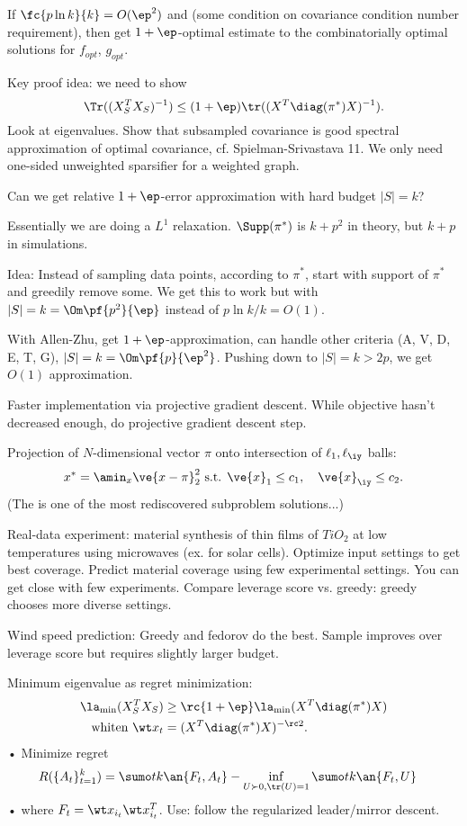 If $\fc{p\ln k}{k} = O(\ep^2)$ and (some condition on covariance condition number requirement), then get $1+\ep$-optimal estimate to the combinatorially optimal solutions for $f_{opt}$, $g_{opt}$. 

Key proof idea: we need to show
$$
\Tr((X_S^TX_S)^{-1}) \le (1+\ep) \tr((X^T\diag(\pi^*)X)^{-1}).
$$
Look at eigenvalues. Show that subsampled covariance is good spectral approximation of optimal covariance, cf. Spielman-Srivastava 11. 
We only need one-sided unweighted sparsifier for a weighted graph. %

Can we get relative $1+\ep$-error approximation with hard budget $|S|=k$?

Essentially we are doing a $L^1$ relaxation. 
$\Supp(\pi^*)$ is $k+p^2$ in theory, but $k+p$ in simulations.

Idea: Instead of sampling data points, according to $\pi^*$, start with support of $\pi^*$ and greedily remove some. 
We get this to work but with $|S|=k=\Om\pf{p^2}{\ep}$ instead of $p\ln k/k = O(1)$.

With Allen-Zhu, get $1+\ep$-approximation, can handle other criteria (A, V, D, E, T, G), $|S|=k=\Om\pf{p}{\ep^2}$.  
 Pushing down to $|S|=k>2p$, we get $O(1)$ approximation.

Faster implementation via projective gradient descent. While objective hasn't decreased enough, do projective gradient descent step. 


Projection of $N$-dimensional vector $\pi$ onto intersection of $\ell_1, \ell_\iy$ balls: 
$$x^* = \amin_x\ve{x-\pi}_2^2\text{ s.t. }\ve{x}_1\le c_1,\quad \ve{x}_\iy\le c_2.$$
(The is one of the most rediscovered subproblem solutions...)

Real-data experiment: material synthesis of thin films of $TiO_2$ at low temperatures using microwaves (ex. for solar cells). Optimize input settings to get best coverage. Predict material coverage using few experimental settings. 
You can get close with few experiments.
Compare leverage score vs. greedy: greedy chooses more diverse settings.

Wind speed prediction: Greedy and fedorov do the best. Sample improves over leverage score but requires slightly larger budget. 


Minimum eigenvalue as regret minimization:
\begin{align}
\la_{\min}(X_S^TX_S) &\ge \rc{1+\ep} \la_{\min} (X^T\diag(\pi^*) X)\\
\text{whiten }
\wt x_t &= (X^T \diag(\pi^*) X)^{-\rc 2}.
\end{align}•
 Minimize regret
\begin{align}
R(\{A_t\}_{t=1}^k) &= \sumo tk \an{F_t,A_t} 
- \inf_{U\succ 0, \tr(U)=1} \sumo tk \an{F_t,U}
\end{align}•
where $F_t=\wt x_{i_t}\wt x_{i_t}^T$. 
Use: follow the regularized leader/mirror descent.

